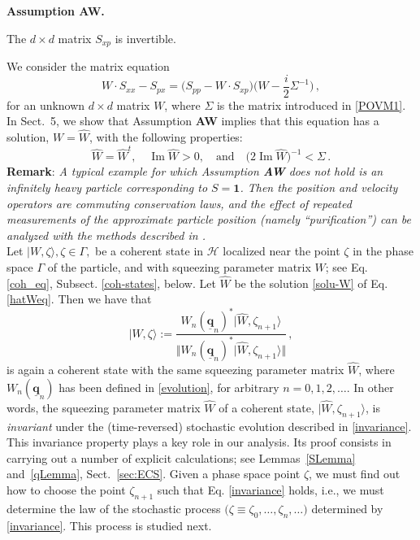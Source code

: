 \documentclass[11pt]{article}
\makeatletter
\def\namedlabel#1#2{\begingroup
	\def\@currentlabel{#2}%
	\label{#1}\endgroup
}
\newenvironment{assumption}[2]{\par\vspace{1em}\noindent\textbf{Assumption #1.}\namedlabel{#2}{\textbf{#1}}}{\par\vspace{1em}}
\newcommand{\ket}[1]{|{#1}\rangle}
\renewcommand{\Im}{\operatorname{Im}}
\makeatother
\begin{document}
\begin{assumption}{AW}{ass:W} 
The $d\times d$ matrix $S_{xp}$ is invertible.
\end{assumption}

We consider the matrix equation
\begin{equation}\label{hatWeq}
W\cdot S_{xx}-S_{px}= \big(S_{pp}-W\cdot S_{xp}\big)\big( W- \frac{i}{2} \Sigma^{-1}\big)\,,
\end{equation}       
for an unknown $d\times d$ matrix $W$, where $\Sigma$ is the matrix introduced  in \eqref{POVM1}.
In Sect.~5, we show that Assumption {\bf{AW}} implies that this equation has a solution, $W=\widehat{W}$, with the following properties:
\begin{equation}\label{solu-W}
 \widehat{W}=\widehat{W}^{t}, \quad \Im{\widehat{W}} >0, \quad \text{and}\quad \big(2 \Im{\widehat{W}}\big)^{-1} < \Sigma\,.
\end{equation}
\noindent
{\bf{Remark}}: \textit{A typical example for which Assumption {\bf{AW}} does not hold is an infinitely heavy particle 
corresponding to $S=\mathbf{1}$. Then the position and velocity operators are commuting conservation laws, and the 
effect of repeated measurements of the approximate particle position (namely ``purification'') can be analyzed with the 
methods described in \cite{BCFFS}.} \\

Let $\vert W, \zeta \rangle, \zeta \in \Gamma,$ be a coherent state in $\mathcal{H}$ localized near the point $\zeta$ 
in the phase space $\Gamma$ of the particle, and with squeezing parameter matrix $W$; see Eq. \eqref{coh_eq}, 
Subsect. \ref{coh-states}, below. Let $\widehat{W}$ be the solution \eqref{solu-W} of Eq. \eqref{hatWeq}. Then we have that
\begin{equation}\label{invariance}
 \vert \widehat{W}, \zeta \rangle:= \frac{W_{n}(\underline{\mathbf{q}}_{n})^{*}\ket{\widehat W,\zeta_{n+1}}}{\Vert W_{n}(\underline{\mathbf{q}}_{n})^{*}\ket{\widehat W,\zeta_{n+1}} \Vert }\,, 
\end{equation}
is again a coherent state with the same squeezing parameter matrix $\widehat{W}$, where 
$W_{n}(\underline{\mathbf{q}}_{n})$ has been defined in \eqref{evolution}, for arbitrary $n=0,1,2, \dots$. 
In other words, the squeezing parameter matrix $\widehat{W}$ of a coherent state, 
$\vert \widehat{W}, \zeta_{n+1} \rangle$, is \textit{invariant} under the (time-reversed) stochastic evolution described in 
\eqref{invariance}. This invariance property plays a key role in our analysis. Its proof consists in carrying out a number of 
explicit calculations; see Lemmas~\ref{SLemma} and~\ref{qLemma},
Sect.~\ref{sec:ECS}. Given a phase space point $\zeta$, we must find out how to choose the point $\zeta_{n+1}$ 
such that Eq. \eqref{invariance} holds, i.e., we must determine the law of the stochastic process 
$\big(\zeta \equiv \zeta_0, \dots, \zeta_n, \dots \big)$ determined by \eqref{invariance}. This process is studied next.\\
\end{document}
